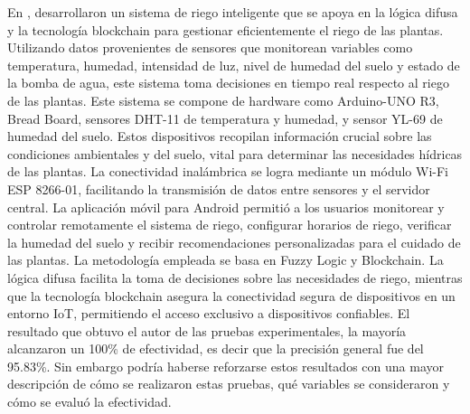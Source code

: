\bigbreak
En \cite{munir_intelligent_2019}, desarrollaron un sistema de riego inteligente que se apoya en la lógica difusa y la tecnología blockchain para gestionar eficientemente el riego de las plantas. Utilizando datos provenientes de sensores que monitorean variables como temperatura, humedad, intensidad de luz, nivel de humedad del suelo y estado de la bomba de agua, este sistema toma decisiones en tiempo real respecto al riego de las plantas. Este sistema se compone de hardware como Arduino-UNO R3, Bread Board, sensores DHT-11 de temperatura y humedad, y sensor YL-69 de humedad del suelo. Estos dispositivos recopilan información crucial sobre las condiciones ambientales y del suelo, vital para determinar las necesidades hídricas de las plantas. La conectividad inalámbrica se logra mediante un módulo Wi-Fi ESP 8266-01, facilitando la transmisión de datos entre sensores y el servidor central. La aplicación móvil para Android permitió a los usuarios monitorear y controlar remotamente el sistema de riego, configurar horarios de riego, verificar la humedad del suelo y recibir recomendaciones personalizadas para el cuidado de las plantas. La metodología empleada se basa en Fuzzy Logic y Blockchain. La lógica difusa facilita la toma de decisiones sobre las necesidades de riego, mientras que la tecnología blockchain asegura la conectividad segura de dispositivos en un entorno IoT, permitiendo el acceso exclusivo a dispositivos confiables. El resultado que obtuvo el autor de las pruebas experimentales, la mayoría alcanzaron un 100\% de efectividad, es decir que la precisión general fue del 95.83\%. Sin embargo podría haberse reforzarse estos resultados con una mayor descripción de cómo se realizaron estas pruebas, qué variables se consideraron y cómo se evaluó la efectividad.

